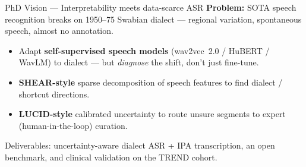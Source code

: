 \documentclass[10pt]{beamer}
\begin{document}
\begin{frame}{PhD Vision — Interpretability meets data-scarce ASR}
  \textbf{Problem:} SOTA speech recognition breaks on 1950--75 Swabian dialect —
  regional variation, spontaneous speech, almost no annotation.
  \vspace{0.5em}
  \begin{itemize}
    \item Adapt \textbf{self-supervised speech models} (wav2vec~2.0 / HuBERT /
          WavLM) to dialect — but \emph{diagnose} the shift, don't just fine-tune.
    \item \textbf{SHEAR-style} sparse decomposition of speech features to find
          dialect / shortcut directions.
    \item \textbf{LUCID-style} calibrated uncertainty to route unsure segments to
          expert (human-in-the-loop) curation.
  \end{itemize}
  \vspace{0.4em}
  \begin{center}
    \small Deliverables: uncertainty-aware dialect ASR + IPA transcription,
    an open benchmark, and clinical validation on the TREND cohort.
  \end{center}
\end{frame}
\end{document}
